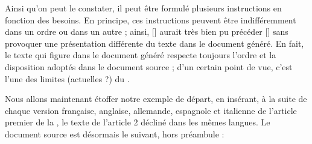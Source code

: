 \documentclass{article}
\begin{document}
\begin{ltext}
\ltextline{}
\ltextline{}
\end{ltext}

Ainsi qu'on peut le constater, il peut être formulé plusieurs instructions  en fonction des besoins. En principe, ces instructions peuvent être indifféremment dans un ordre ou dans un autre ; ainsi, [] aurait très bien pu précéder [] sans provoquer une présentation différente du texte dans le document généré. En fait, le texte qui figure dans le document généré respecte toujours l'ordre et la disposition adoptés dans le document source ; d'un certain point de vue, c'est l'une des limites (actuelles ?) du .

\tutostep
Nous allons maintenant étoffer notre exemple de départ, en insérant, à la suite de chaque version française, anglaise, allemande, espagnole et italienne de l'article premier de la , le texte de l'article 2 décliné dans les mêmes langues. Le document source est désormais le suivant, hors préambule :
\end{document}
